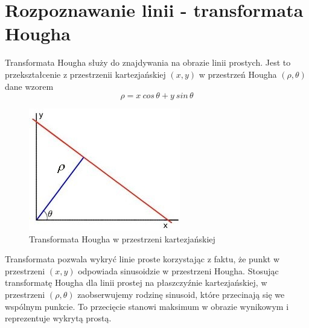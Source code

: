 \section{Rozpoznawanie linii - transformata Hougha}

Transformata Hougha służy do znajdywania na obrazie linii prostych. Jest to przekształcenie z przestrzenii kartezjańskiej $(x,y)$ w przestrzeń Hougha $(\rho, \theta)$ dane wzorem
\begin{equation}
\rho = x\: cos\, \theta + y\: sin\, \theta
\end{equation}

\begin{figure}[!htb]
  \begin{center}
    \includegraphics[scale=1]{img/hough-line.jpg}
    \caption{Transformata Hougha w przestrzeni kartezjańskiej}
  \end{center}
  
  \label{rys:maglev}
\end{figure}

Transformata pozwala wykryć linie proste korzystając z faktu, że punkt w przestrzeni $(x,y)$ odpowiada sinusoidzie w przestrzeni Hougha. Stosując transformatę Hougha dla linii prostej na płaszczyźnie kartezjańskiej, w przestrzeni $(\rho, \theta)$ zaobserwujemy rodzinę sinusoid, które przecinają się we wspólnym punkcie. To przecięcie stanowi maksimum w obrazie wynikowym i reprezentuje wykrytą prostą.



%

